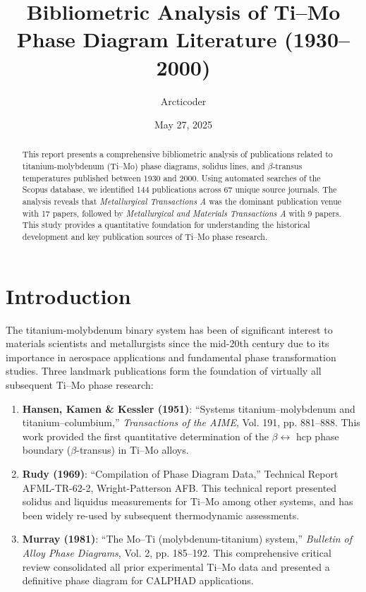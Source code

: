 \documentclass[11pt,a4paper]{article}
\title{Bibliometric Analysis of Ti--Mo Phase Diagram Literature (1930--2000)}
\author{Arcticoder}
\date{May 27, 2025}
\begin{document}
\maketitle

\begin{abstract}
This report presents a comprehensive bibliometric analysis of publications related to titanium-molybdenum (Ti--Mo) phase diagrams, solidus lines, and $\beta$-transus temperatures published between 1930 and 2000. Using automated searches of the Scopus database, we identified 144 publications across 67 unique source journals. The analysis reveals that \textit{Metallurgical Transactions A} was the dominant publication venue with 17 papers, followed by \textit{Metallurgical and Materials Transactions A} with 9 papers. This study provides a quantitative foundation for understanding the historical development and key publication sources of Ti--Mo phase research.
\end{abstract}

\section{Introduction}

The titanium-molybdenum binary system has been of significant interest to materials scientists and metallurgists since the mid-20th century due to its importance in aerospace applications and fundamental phase transformation studies. Three landmark publications form the foundation of virtually all subsequent Ti--Mo phase research:

\begin{enumerate}
    \item \textbf{Hansen, Kamen \& Kessler (1951)}: ``Systems titanium--molybdenum and titanium--columbium,'' \textit{Transactions of the AIME}, Vol. 191, pp. 881--888. This work provided the first quantitative determination of the $\beta \leftrightarrow$ hcp phase boundary ($\beta$-transus) in Ti--Mo alloys.
    
    \item \textbf{Rudy (1969)}: ``Compilation of Phase Diagram Data,'' Technical Report AFML-TR-62-2, Wright-Patterson AFB. This technical report presented solidus and liquidus measurements for Ti--Mo among other systems, and has been widely re-used by subsequent thermodynamic assessments.
    
    \item \textbf{Murray (1981)}: ``The Mo--Ti (molybdenum-titanium) system,'' \textit{Bulletin of Alloy Phase Diagrams}, Vol. 2, pp. 185--192. This comprehensive critical review consolidated all prior experimental Ti--Mo data and presented a definitive phase diagram for CALPHAD applications.
\end{enumerate}
\end{document}
